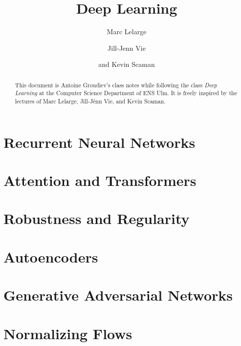 \documentclass[toc, titlepaged]{../cs-classes/cs-classes}
\title{Deep Learning}
\author{Marc Lelarge\and Jill-Jenn Vie\and and Kevin Scaman}
\begin{document}
\begin{abstract}
    This document is Antoine Groudiev's class notes while following the class \emph{Deep Learning} at the Computer Science Department of ENS Ulm. It is freely inspired by the lectures of Marc Lelarge, Jill-Jênn Vie, and Kevin Scaman. 
\end{abstract}





% 



\section{Recurrent Neural Networks}

\section{Attention and Transformers}

\section{Robustness and Regularity}



\section{Autoencoders}

\section{Generative Adversarial Networks}

\section{Normalizing Flows}
\end{document}
